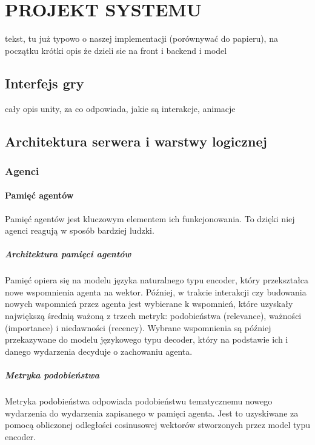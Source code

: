 \chapter{PROJEKT SYSTEMU}

tekst, tu już typowo o naszej implementacji (porównywać do papieru), na początku krótki opis że dzieli sie na front i backend i model


\section{Interfejs gry}

cały opis unity, za co odpowiada, jakie są interakcje, animacje



\section{Architektura serwera i warstwy logicznej}
\label{sec:architektura_serwera}

\subsection{Agenci}

\subsubsection{Pamięć agentów}
Pamięć agentów jest kluczowym elementem ich funkcjonowania.
To dzięki niej agenci reagują w sposób bardziej ludzki.

\paragraph{Architektura pamięci agentów}
Pamięć opiera się na modelu języka naturalnego typu encoder, który przekształca
nowe wspomnienia agenta na wektor. Później, w trakcie interakcji czy budowania nowych
wspomnień przez agenta jest wybierane k wspomnień, które uzyskały największą średnią
ważoną z trzech metryk: podobieństwa (relevance), ważności (importance) i niedawności (recency).
Wybrane wspomnienia są później przekazywane do modelu językowego typu decoder, który na
podstawie ich i danego wydarzenia decyduje o zachowaniu agenta.

\paragraph{Metryka podobieństwa}
Metryka podobieństwa odpowiada podobieństwu tematycznemu nowego wydarzenia do
wydarzenia zapisanego w pamięci agenta. Jest to uzyskiwane za pomocą obliczonej
odległości cosinusowej wektorów stworzonych przez model typu encoder.

